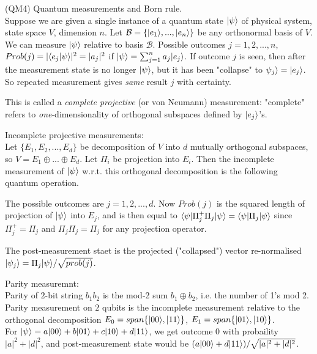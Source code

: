 \documentclass[a4paper]{article}
\begin{document}
(QM4) Quantum measurements and Born rule.\\
Suppose we are given a single instance of a quantum state $|\psi\rangle$ of physical system, state space $V$, dimension $n$. Let $\mathcal{B} = \{|e_1\rangle,...,|e_n\rangle \}$ be any orthonormal basis of $V$. We can measure $|\psi\rangle$ relative to basis $\mathcal{B}$. Possible outcomes $j=1,2,...,n$, $Prob(j) = |\langle e_j |\psi \rangle |^2 = |a_j|^2$ if $|\psi \rangle = \sum_{j=1}^n a_j | e_j\rangle$. If outcome $j$ is seen, then after the measurement state is no longer $|\psi\rangle$, but it has been "collapse" to $\psi_j\rangle = |e_j\rangle$. So repeated measurement gives \emph{same} result $j$ with certainty.

This is called a \emph{complete projective} (or von Neumann) measurement: "complete" refers to \emph{one}-dimensionality of orthogonal subspaces defined by $|e_j\rangle$'s. 

Incomplete projective measurements:\\
Let $\{E_1,E_2,...,E_d\}$ be decomposition of $V$ into $d$ mutually orthogonal subspaces, so $V = E_1 \oplus ... \oplus E_d$. Let $\Pi_i$ be projection into $E_i$. Then the incomplete measurement of $|\psi\rangle$ w.r.t. this orthogonal decomposition is the following quantum operation.

The possible outcomes are $j=1,2,...,d$. Now $Prob(j)$ is the squared length of projection of $|\psi\rangle$ into $E_j$, and is then equal to $\langle \psi | \Pi_j^+ \Pi_j | \psi \rangle = \langle \psi | \Pi_j | \psi \rangle$ since $\Pi_j^+ = \Pi_j$ and $\Pi_j\Pi_j = \Pi_j$ for any projection operator.

The post-measurement staet is the projected ("collapsed") vector re-normalised $|\psi_j\rangle = \Pi_j | \psi \rangle/\sqrt{prob(j)}$.

\begin{eg}
Parity measuremnt:\\
Parity of $2$-bit string $b_1b_2$ is the mod-2 sum $b_1 \oplus b_2$, i.e. the number of 1's mod 2.\\
Parity measurement on $2$ qubits is the incomplete measurement relative to the orthogonal decomposition $E_0 = span\{|00\rangle, |11\rangle\}$, $E_1 = span \{|01\rangle, |10\rangle\}$.\\
For $|\psi\rangle = a|00\rangle+b|01\rangle+c|10\rangle+d|11\rangle$, we get outcome $0$ with probaility $|a|^2+|d|^2$, and post-measurement state would be $(a|00\rangle + d|11\rangle) / \sqrt{|a|^2+|d|^2}$.
\end{eg}
\end{document}
